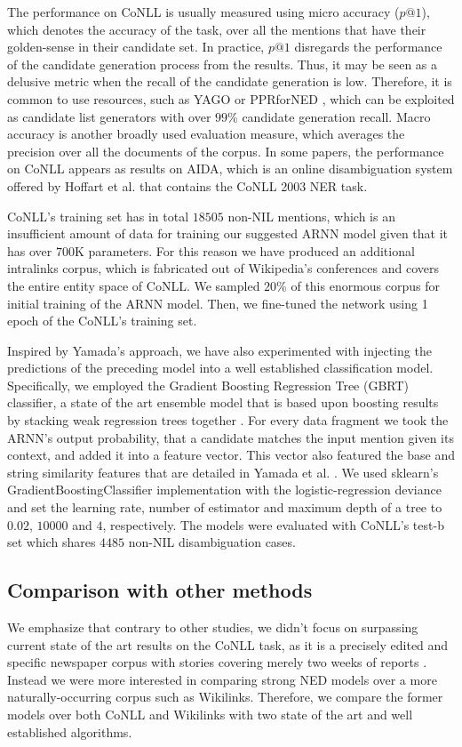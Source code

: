 \documentclass[11pt]{article}
\begin{document}
	The performance on CoNLL is usually measured using micro accuracy ($p@1$), which denotes the accuracy of the task, over all the mentions that have their golden-sense in their candidate set. In practice, $p@1$ disregards the performance of the candidate generation process from the results. Thus, it may be seen as a delusive metric when the recall of the candidate generation is low. Therefore, it is common to use resources, such as YAGO \cite{hoffart2011robust} or PPRforNED \cite{Pershina2015}, which can be exploited as candidate list generators with over $99$\% candidate generation recall. 
	Macro accuracy is another broadly used evaluation measure, which averages the precision over all the documents of the corpus. In some papers, the performance on CoNLL appears as results on AIDA, which is an online disambiguation system offered by Hoffart et al. \cite{hoffart2011robust} that contains the CoNLL 2003 NER task.
	
	CoNLL's training set has in total $18505$ non-NIL mentions, which is an insufficient amount of data for training our suggested ARNN model given that it has over $700$K parameters. For this reason we have  produced an additional intralinks corpus, which is fabricated out of Wikipedia's conferences and covers the entire entity space of CoNLL. We sampled $20$\% of this enormous corpus for initial training of the ARNN model. Then, we fine-tuned the network using 1 epoch of the CoNLL's training set.
	
	Inspired by Yamada's approach, we have also experimented with injecting the predictions of the preceding model into a well established classification model. Specifically, we employed the Gradient Boosting Regression Tree (GBRT) classifier, a state of the art ensemble model  that is based upon boosting results by stacking weak regression trees together \cite{friedman2001greedy}. For every data fragment we took the ARNN's output probability, that a candidate matches the input mention given its context, and added it into a feature vector. This vector also featured the base and string similarity features that are detailed in Yamada et al. \cite{yamada2016joint}. We used sklearn's GradientBoostingClassifier implementation \cite{pedregosa2011scikit} with the logistic-regression deviance and set the learning rate, number of estimator and maximum depth of a tree to $0.02$, $10000$ and $4$, respectively. 
	The models were evaluated with CoNLL's test-b set which shares $4485$ non-NIL disambiguation cases.
	
	\subsection{Comparison with other methods}
	We emphasize that contrary to other studies, we didn't focus on surpassing current state of the art results on the CoNLL task, as it is a precisely edited and specific newspaper corpus with stories covering merely two weeks of reports \cite{Sang2003}. Instead we were more interested in comparing strong NED models over a more naturally-occurring corpus such as Wikilinks. 
	Therefore, we compare the former models over both CoNLL and Wikilinks with two state of the art and well established algorithms.
	
\end{document}
